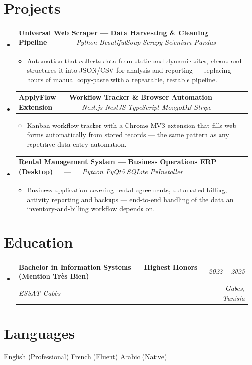 \documentclass[letterpaper,9pt]{article}
\makeatletter
\newcommand{\resumeItem}[1]{\item\small{#1}}
\newcommand{\resumeSubheading}[4]{
  \vspace{-1pt}\item
  \begin{tabular*}{0.97\textwidth}[t]{l@{\extracolsep{\fill}}r}
    \textbf{#1} & \textit{\color{greytext}#2} \\
    \textit{\small\color{greytext} #3} & \textit{\small\color{greytext} #4}
  \end{tabular*}\vspace{-2pt}
}
\newcommand{\resumeProjectHeading}[2]{
  \item
  \begin{tabular*}{0.97\textwidth}{l@{\extracolsep{\fill}}r}
    \small #1 & #2
  \end{tabular*}\vspace{-1pt}
}
\newcommand{\resumeSubHeadingListStart}{\begin{itemize}[leftmargin=0.18in, label={}, itemsep=1.2pt, topsep=2.5pt, parsep=0pt]}
\newcommand{\resumeSubHeadingListEnd}{\end{itemize}\vspace{-2pt}}
\newcommand{\resumeProjectListStart}{\begin{itemize}[leftmargin=0.24in, label={}, itemsep=0.9pt, topsep=1.2pt, parsep=0pt]}
\newcommand{\resumeProjectListEnd}{\end{itemize}\vspace{-2pt}}
\makeatother
\begin{document}
\section{Projects}
\resumeSubHeadingListStart

  \resumeProjectHeading{\textbf{Universal Web Scraper --- Data Harvesting \& Cleaning Pipeline} $\quad$ --- $\quad$ \emph{\color{greytext}Python \textperiodcentered{} BeautifulSoup \textperiodcentered{} Scrapy \textperiodcentered{} Selenium \textperiodcentered{} Pandas}}{}
    \resumeProjectListStart
      \resumeItem{Automation that collects data from static and dynamic sites, cleans and structures it into JSON/CSV for analysis and reporting — replacing hours of manual copy-paste with a repeatable, testable pipeline.}
    \resumeProjectListEnd

  \resumeProjectHeading{\textbf{ApplyFlow --- Workflow Tracker \& Browser Automation Extension} $\quad$ --- $\quad$ \emph{\color{greytext}Next.js \textperiodcentered{} NestJS \textperiodcentered{} TypeScript \textperiodcentered{} MongoDB \textperiodcentered{} Stripe}}{}
    \resumeProjectListStart
      \resumeItem{Kanban workflow tracker with a Chrome MV3 extension that fills web forms automatically from stored records — the same pattern as any repetitive data-entry automation.}
    \resumeProjectListEnd

  \resumeProjectHeading{\textbf{Rental Management System --- Business Operations ERP (Desktop)} $\quad$ --- $\quad$ \emph{\color{greytext}Python \textperiodcentered{} PyQt5 \textperiodcentered{} SQLite \textperiodcentered{} PyInstaller}}{}
    \resumeProjectListStart
      \resumeItem{Business application covering rental agreements, automated billing, activity reporting and backups — end-to-end handling of the data an inventory-and-billing workflow depends on.}
    \resumeProjectListEnd

\resumeSubHeadingListEnd\vspace{-3pt}

\section{Education}
\resumeSubHeadingListStart
  \resumeSubheading{Bachelor in Information Systems --- Highest Honors (Mention Très Bien)}{2022 -- 2025}{ESSAT Gabès}{Gabes, Tunisia}
\resumeSubHeadingListEnd\vspace{-1pt}

\section{Languages}
\begin{itemize}[leftmargin=0.18in, label={}, topsep=2pt, itemsep=1pt, parsep=0pt]
\footnotesize{
  \item English (Professional) \textperiodcentered{} French (Fluent) \textperiodcentered{} Arabic (Native)
}
\end{itemize}
\end{document}
